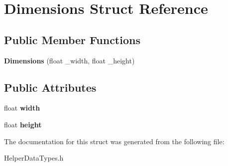 \hypertarget{structDimentions}{}\section{Dimensions Struct Reference}
\label{structDimentions}
\subsection*{Public Member Functions}
\begin{DoxyCompactItemize}
\item 
\mbox{\label{structDimentions_a09f92ee6239282f5d76c77d87f46f93e}} 
{\bfseries Dimensions} (float \+\_\+width, float \+\_\+height)
\end{DoxyCompactItemize}
\subsection*{Public Attributes}
\begin{DoxyCompactItemize}
\item 
\mbox{\label{structDimentions_ab97c472cbe82f80e9a3a4f4c2ad9fe67}} 
float {\bfseries width}
\item 
\mbox{\label{structDimentions_a5481fb9860d7b293a20c720c027bae3a}} 
float {\bfseries height}
\end{DoxyCompactItemize}


The documentation for this struct was generated from the following file\+:\begin{DoxyCompactItemize}
\item 
Helper\+Data\+Types.\+h\end{DoxyCompactItemize}
